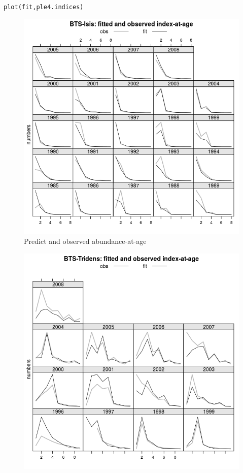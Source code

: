 \documentclass[a4paper,english,10pt]{article}\usepackage[]{graphicx}\usepackage[]{color}
\makeatletter
\newcommand{\hlstd}[1]{\textcolor[rgb]{0.196,0.196,0.196}{#1}}%
\newcommand{\hlkwd}[1]{\textcolor[rgb]{0.78,0.227,0.412}{#1}}%
\newenvironment{kframe}{%
 \def\at@end@of@kframe{}%
 \ifinner\ifhmode%
  \def\at@end@of@kframe{\end{minipage}}%
  \begin{minipage}{\columnwidth}%
 \fi\fi%
 \def\FrameCommand##1{\hskip\@totalleftmargin \hskip-\fboxsep
 \colorbox{shadecolor}{##1}\hskip-\fboxsep
     \hskip-\linewidth \hskip-\@totalleftmargin \hskip\columnwidth}%
 \MakeFramed {\advance\hsize-\width
   \@totalleftmargin\z@ \linewidth\hsize
   \@setminipage}}%
 {\par\unskip\endMakeFramed%
 \at@end@of@kframe}
\newenvironment{knitrout}{}{} %
\makeatother
\begin{document}
\begin{knitrout}
\color{fgcolor}\begin{kframe}
\begin{alltt}
\hlkwd{plot}\hlstd{(fit, ple4.indices)}
\end{alltt}
\end{kframe}\begin{figure}[H]

{\centering \includegraphics[width=.9\linewidth]{figure/idxplt-1} 

}

\caption[Predict and observed abundance-at-age]{Predict and observed abundance-at-age}\label{fig:idxplt1}
\end{figure}

\begin{figure}[H]

{\centering \includegraphics[width=.9\linewidth]{figure/idxplt-2} 

}
\end{figure}
\end{knitrout}
\end{document}
